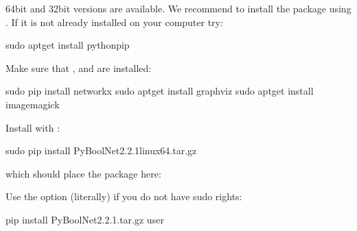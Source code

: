 \documentclass[letterpaper,10pt,english]{sphinxmanual}
\begin{document}
64bit and 32bit versions are available. We recommend to install the package using . If it is not already installed on your computer try:

\begin{sphinxVerbatim}[commandchars=\\\{\}]
\PYGZdl{} sudo apt\PYGZhy{}get install python\PYGZhy{}pip
\end{sphinxVerbatim}

Make sure that {\hyperref[\detokenize{Installation:installation-networkx}]{}}, {\hyperref[\detokenize{Installation:installation-graphviz}]{}} and {\hyperref[\detokenize{Installation:installation-imagemagick}]{}} are installed:

\begin{sphinxVerbatim}[commandchars=\\\{\}]
\PYGZdl{} sudo pip install networkx
\PYGZdl{} sudo apt\PYGZhy{}get install graphviz
\PYGZdl{} sudo apt\PYGZhy{}get install imagemagick
\end{sphinxVerbatim}

Install  with :

\begin{sphinxVerbatim}[commandchars=\\\{\}]
\PYGZdl{} sudo pip install PyBoolNet\PYGZhy{}2.2.1\PYGZus{}linux64.tar.gz
\end{sphinxVerbatim}

which should place the package here:

\begin{sphinxVerbatim}[commandchars=\\\{\}]
\end{sphinxVerbatim}

Use the option  (literally) if you do not have sudo rights:

\begin{sphinxVerbatim}[commandchars=\\\{\}]
\PYGZdl{} pip install PyBoolNet\PYGZhy{}2.2.1.tar.gz \PYGZhy{}\PYGZhy{}user
\end{sphinxVerbatim}
\end{document}
